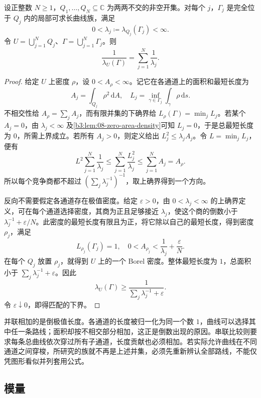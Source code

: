 \begin{proposition}[不交通道的并联公式]\label{b3:prop:08-parallel-channels}
设正整数 \(N\ge1\)，\(Q_1,\ldots,Q_N\subseteq\mathbb C\) 为两两不交的非空开集。对每个 \(j\)，\(\Gamma_j\) 是完全位于 \(Q_j\) 内的局部可求长曲线族，满足
\[
 0<\lambda_j\coloneqq\lambda_{Q_j}(\Gamma_j)<\infty.
\]
令 \(U=\bigcup_{j=1}^NQ_j\)、\(\Gamma=\bigcup_{j=1}^N\Gamma_j\)。则
\[
 \frac1{\lambda_U(\Gamma)}=\sum_{j=1}^N\frac1{\lambda_j}.
\]
\end{proposition}
\begin{proof}
给定 \(U\) 上密度 \(\rho\)，设 \(0<A_\rho<\infty\)。记它在各通道上的面积和最短长度为
\[
 A_j=\int_{Q_j}\rho^2\,\mathrm dA,\quad
 L_j=\inf_{\gamma\in\Gamma_j}\int_\gamma\rho\,\mathrm ds.
\]
不相交性给 \(A_\rho=\sum_jA_j\)，而有限并集的下确界给 \(L_\rho(\Gamma)=\min_jL_j\)。若某个 \(A_j=0\)，由 \(\lambda_j<\infty\) 及\cref{b3:lem:08-zero-area-density}可知 \(L_j=0\)，于是总最短长度为 \(0\)，所需上界成立。若所有 \(A_j>0\)，则定义给出 \(L_j^2\le\lambda_j A_j\)。令 \(L=\min_jL_j\)，便有
\[
 L^2\sum_{j=1}^N\frac1{\lambda_j}
 \le\sum_{j=1}^N\frac{L_j^2}{\lambda_j}
 \le\sum_{j=1}^NA_j=A_\rho.
\]
所以每个竞争商都不超过 \((\sum_j\lambda_j^{-1})^{-1}\)，取上确界得到一个方向。

反向不需要假定各通道存在极值密度。给定 \(\varepsilon>0\)，由 \(0<\lambda_j<\infty\) 的上确界定义，可在每个通道选择密度，其商为正且足够接近 \(\lambda_j\)，使这个商的倒数小于 \(\lambda_j^{-1}+\varepsilon/N\)。此密度的最短长度有限且为正，将它除以自己的最短长度，得到密度 \(\rho_j\)，满足
\[
 L_{\rho_j}(\Gamma_j)=1,\quad
 0<A_{\rho_j}<\frac1{\lambda_j}+\frac\varepsilon N.
\]
在每个 \(Q_j\) 放置 \(\rho_j\)，就得到 \(U\) 上的一个 Borel 密度。整体最短长度为 \(1\)，总面积小于 \(\sum_j\lambda_j^{-1}+\varepsilon\)。因此
\[
 \lambda_U(\Gamma)\ge
 \frac1{\sum_j\lambda_j^{-1}+\varepsilon}.
\]
令 \(\varepsilon\downarrow0\)，即得匹配的下界。
\end{proof}

并联相加的是倒极值长度。各通道的长度被归一化为同一个数 \(1\)，曲线可以选择其中任一条路线；面积却按不相交部分相加，这正是倒数出现的原因。串联比较则要求每条总曲线依次穿过所有子通道，长度贡献也必须相加。若实际允许曲线在不同通道之间穿梭，所研究的族就不再是上述并集，必须先重新辨认全部路线，不能仅凭图形看似并列套用公式。

\subsection{模量}
\label{b3:subsec:080403}

